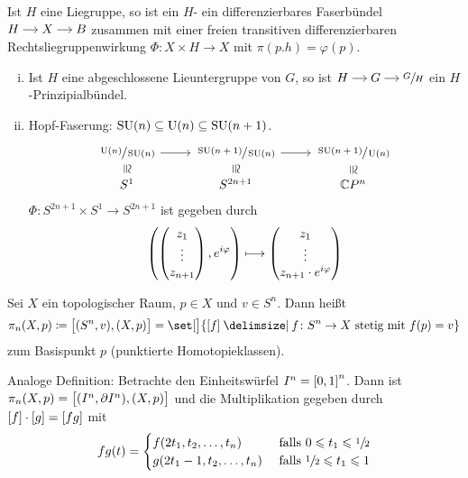 \begin{definition}
	Ist $H$ eine Liegruppe, so ist ein $H$- ein differenzierbares Faserbündel \(
		\begin{tikzcd}[cramped,sep=small]
			H \rar & X \rar & B
		\end{tikzcd}
	\)
	zusammen mit einer freien transitiven differenzierbaren Rechtsliegruppenwirkung $\Phi \colon X \times H \to X$ mit $\pi(p.h) = \varphi(p)$.
\end{definition}

\begin{beispiel*}
	\begin{enumerate}[(i)]
		\item Ist $H$ eine abgeschlossene Lieuntergruppe von $G$, so ist \(
			\begin{tikzcd}[cramped,sep=small]
				H \rar & G \rar & \sfrac{G}{H}
			\end{tikzcd}
		\) ein $H$-Prinzipialbündel.
		\item Hopf-Faserung: $\SU(n) \subseteq \Un(n) \subseteq \SU(n+1)$.
		\[
			\begin{tikzcd}
				\sfrac{\Un(n)}{\SU(n)} \dar[phantom,sloped,"\cong"] \rar & \sfrac{\SU(n+1)}{\SU(n)} \dar[phantom,sloped,"\cong"] \rar &  \sfrac{\SU(n+1)}{\Un(n)} \dar[phantom,sloped,"\cong"] \\[-1em]
				S^1 & S^{2n+1} & \mathbb{C}P^n
			\end{tikzcd}
		\] 
		$\Phi \colon S^{2n+1} \times S^1 \to S^{2n+1}$ ist gegeben durch
		\[
			\enbrace*{\begin{pmatrix}
				z_1 \\ \vdots \\ z_{n+1}
			\end{pmatrix}, e^{i \varphi}} \longmapsto
			\begin{pmatrix}
				z_1 \\ \vdots \\ z_{n+1} \cdot e^{i \varphi}
			\end{pmatrix}
		\]
	\end{enumerate}
\end{beispiel*}

\begin{definition}
	Sei $X$ ein topologischer Raum, $p \in X$ und $v \in S^n$.
	Dann heißt 
	\[
		\pi_n(X,p) \coloneqq \benbrace[\big]{(S^n,v) , (X,p)} = \set[\big]{\benbrace*{f} \given f \colon S^n \to X \text{ stetig  mit } f(p)=v }
	\]
	 zum Basispunkt $p$ (punktierte Homotopieklassen).
	
	Analoge Definition: Betrachte den Einheitswürfel $I^n = \benbrace*{0,1}^n$. Dann ist $\pi_n(X,p) = \benbrace[\big]{(I^n,\partial I^n), (X,p)}$ und die Multiplikation gegeben durch $\benbrace*{f} \cdot \benbrace*{g} = \benbrace*{f g}$ mit
	\[
		f g (t ) = \begin{cases}
			f(2t_1, t_2, \ldots ,t_n) &\text{ falls }0 \le t_1 \le \sfrac{1}{2}\\
			g(2t_1 -1, t_2, \ldots , t_n) &\text{ falls } \sfrac{1}{2} \le t_1 \le 1
		\end{cases}
	\]
\end{definition}

